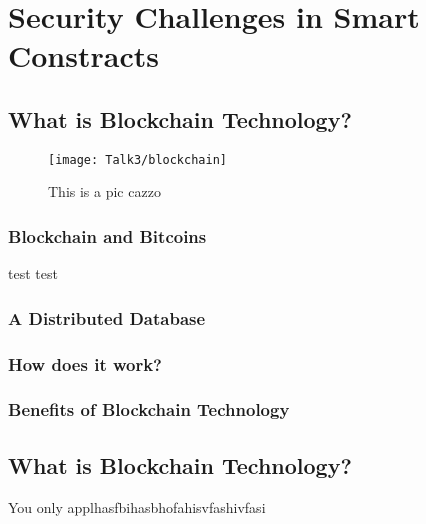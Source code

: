 \chapter{Security Challenges in Smart Constracts}


\newpage

\minitoc %

\newpage

\section{What is Blockchain Technology?}
       \begin{figure}[ht]
         \begin{center}
         \texttt{[image: Talk3/blockchain]}
         \end{center}
         \caption{This is a pic cazzo}
         \label{label}
       \end{figure}
       
\subsection{Blockchain and Bitcoins}
test
test
\subsection{A Distributed Database}
\subsection{How does it work?}

\subsection{Benefits of Blockchain Technology}
\section{What is Blockchain Technology?}

You only applhasfbihasbhofahisvfashivfasi